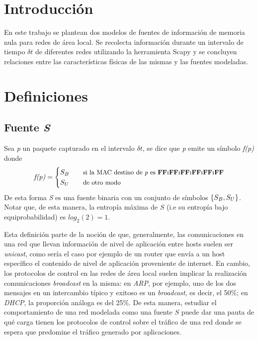 \section{Introducción}
En este trabajo se plantean dos modelos de fuentes de información de memoria nula para redes de área local. Se recolecta información durante un intervalo de tiempo $\delta t$ de diferentes redes utilizando la herramienta Scapy y se concluyen relaciones entre las características físicas de las mismas y las fuentes modeladas.

\section{Definiciones}
\subsection{Fuente \textit{S}}
Sea \textit{p} un paquete capturado en el intervalo $\delta t$, se dice que \textit{p} emite un símbolo \textit{f(p)} donde
\[ \textit{f(p)} = 
     \begin{cases}
       \SimbBroadcast &\quad\text{\footnotesize si la MAC destino de \textit{p} es \textbf{FF:FF:FF:FF:FF:FF}}\\
       \SimbUnicast  &\quad\text{\footnotesize de otro modo}\\
     \end{cases}
\]
De esta forma \textit{S} es una fuente binaria con un conjunto de símbolos $\{ S_{B}, S_{U}\}$. Notar que, de esta manera, la entropía máxima de $S$ (i.e su entropía bajo equiprobabilidad) es $log_2(2) = 1$.

Esta definición parte de la noción de que, generalmente, las comunicaciones en una red que llevan información de nivel de aplicación entre hosts suelen ser \textit{unicast}, como sería el caso por ejemplo de un router que envía a un host específico el contenido de nivel de aplicación proveniente de internet. En cambio, los protocolos de control en las redes de área local suelen implicar la realización comunicaciones \textit{broadcast} en la misma: en \textit{ARP}, por ejemplo, uno de los dos mensajes en un intercambio típico y exitoso es un \textit{broadcast}, es decir, el 50\%; en \textit{DHCP}, la proporción análoga es del 25\%. De esta manera, estudiar el comportamiento de una red modelada como una fuente $S$ puede dar una pauta de qué carga tienen los protocolos de control sobre el tráfico de una red donde se espera que predomine el tráfico generado por aplicaciones.

